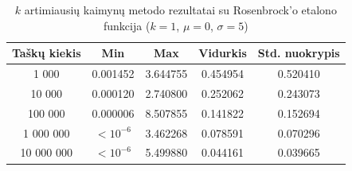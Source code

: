 \begin{table}[H]
    \centering
    \begin{tabular}{|c|c|c|c|c|}
        \hline
        \textbf{Taškų kiekis} & \textbf{Min} & \textbf{Max} & \textbf{Vidurkis} & \textbf{Std. nuokrypis} \\ \hline
        1 000        & 0.001452 & 3.644755 & 0.454954 & 0.520410 \\ \hline
        10 000       & 0.000120 & 2.740800 & 0.252062 & 0.243073 \\ \hline
        100 000      & 0.000006 & 8.507855 & 0.141822 & 0.152694 \\ \hline
        1 000 000    & $<10^{-6}$ & 3.462268 & 0.078591 & 0.070296 \\ \hline
        10 000 000   & $<10^{-6}$ & 5.499880 & 0.044161 & 0.039665 \\ \hline
    \end{tabular}
    \caption{$k$ artimiausių kaimynų metodo rezultatai su Rosenbrock'o etalono funkcija ($k = 1$, $\mu = 0$, $\sigma = 5$)}
\end{table}